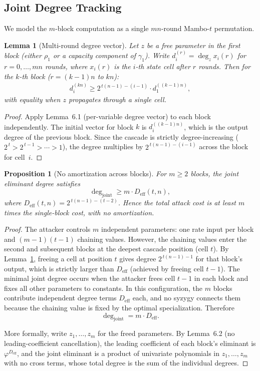 \documentclass[a4paper,11pt]{article}
\newtheorem{lemma}{Lemma}
\newtheorem{proposition}{Proposition}
\begin{document}
\subsection{Joint Degree Tracking}

We model the $m$-block computation as a single $mn$-round Mambo-$t$
permutation.

\begin{lemma}[Multi-round degree vector]\label{lem:multiround_deg}
Let $z$ be a free parameter in the first block (either $\rho_1$ or a
capacity component of $\gamma_1$). Write
$d_i^{(r)} = \deg_z x_i(r)$ for $r = 0,\dots,mn$ rounds, where
$x_i(r)$ is the $i$-th state cell after $r$ rounds. Then for the
$k$-th block ($r = (k-1)n$ to $kn$):
\begin{align*}
d_i^{(kn)} \ge 2^{\,t(n-1)-(i-1)}\cdot d_1^{((k-1)n)},
\end{align*}
with equality when $z$ propagates through a single cell.
\end{lemma}

\begin{proof}
Apply Lemma~6.1 (per-variable degree vector) to each block
independently. The initial vector for block $k$ is
$d_i^{((k-1)n)}$, which is the output degree of the previous block.
Since the cascade is strictly degree-increasing
($2^{\,t} > 2^{\,t-1} > \cdots > 1$), the degree multiplies by
$2^{\,t(n-1)-(i-1)}$ across the block for cell~$i$.
\end{proof}

\begin{proposition}[No amortization across blocks]\label{prop:no_amortize}
For $m \ge 2$ blocks, the joint eliminant degree satisfies
\[
\deg_{\text{joint}} \ge m \cdot D_{\mathrm{eff}}(t,n),
\]
where $D_{\mathrm{eff}}(t,n) = 2^{\,t(n-1)-(t-2)}$.
Hence the total attack cost is at least $m$ times the single-block
cost, with no amortization.
\end{proposition}

\begin{proof}
The attacker controls $m$ independent parameters: one rate input per
block and $(m-1)(t-1)$ chaining values. However, the chaining values
enter the second and subsequent blocks at the deepest cascade position
(cell $t$). By Lemma~\ref{lem:multiround_deg}, freeing a cell at
position $t$ gives degree $2^{\,t(n-1)-1}$ for that block's output,
which is strictly larger than $D_{\mathrm{eff}}$ (achieved by freeing
cell $t-1$). The minimal joint degree occurs when the attacker frees
cell $t-1$ in each block and fixes all other parameters to constants.
In this configuration, the $m$ blocks contribute independent degree
terms $D_{\mathrm{eff}}$ each, and no syzygy connects them because
the chaining value is fixed by the optimal specialization. Therefore
\[
\deg_{\text{joint}} = m \cdot D_{\mathrm{eff}}.
\]

More formally, write $z_1,\dots,z_m$ for the freed parameters. By
Lemma~6.2 (no leading-coefficient cancellation), the leading
coefficient of each block's eliminant is $\varphi^{D_{\mathrm{eff}}}$,
and the joint eliminant is a product of univariate polynomials in
$z_1,\dots,z_m$ with no cross terms, whose total degree is the sum
of the individual degrees.
\end{proof}
\end{document}
